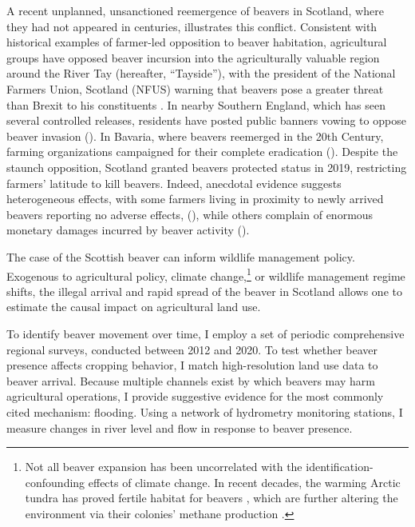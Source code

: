 A recent unplanned, unsanctioned reemergence of beavers in Scotland, where they had not appeared in centuries, illustrates this conflict. Consistent with historical examples of farmer-led opposition to beaver habitation, agricultural groups have opposed beaver incursion into the agriculturally valuable region around the River Tay (hereafter, ``Tayside''), with the president of the National Farmers Union, Scotland (NFUS) warning that beavers pose a greater threat than Brexit to his constituents \citep{castle_beavers_2021}. In nearby Southern England, which has seen several controlled releases, residents have posted public banners vowing to oppose beaver invasion (\cite{itooksomephotos_say_2022}).  In Bavaria, where beavers reemerged in the 20th Century, farming organizations campaigned for their complete eradication (\cite{campbell-palmer_managing_2015}). Despite the staunch opposition, Scotland granted beavers protected status in 2019, restricting farmers' latitude to kill beavers. Indeed, anecdotal evidence suggests heterogeneous effects, with some farmers living in proximity to newly arrived beavers reporting no adverse effects, (\cite{campbell_rd_naturescot_2012}), while others complain of enormous monetary damages incurred by beaver activity (\cite{hamilton_tayside_2015}).

The case of the Scottish beaver can inform wildlife management policy. Exogenous to agricultural policy, climate change,\footnote{Not all beaver expansion has been uncorrelated with the identification-confounding effects of climate change. In recent decades, the warming Arctic tundra has proved fertile habitat for beavers \citep{tape_expanding_2022}, which are further altering the environment via their colonies' methane production \citep{clark_beaver_2023}.} or wildlife management regime shifts, the illegal arrival and rapid spread of the beaver in Scotland  allows one to estimate the causal impact on agricultural land use.

To identify beaver movement over time, I employ a set of periodic comprehensive regional surveys, conducted between 2012 and 2020. To test whether beaver presence affects cropping behavior, I match high-resolution land use data to beaver arrival. Because multiple channels exist by which beavers may harm agricultural operations, I provide suggestive evidence for the most commonly cited mechanism: flooding. Using a network of hydrometry monitoring stations, I measure changes in river level and flow in response to beaver presence.

